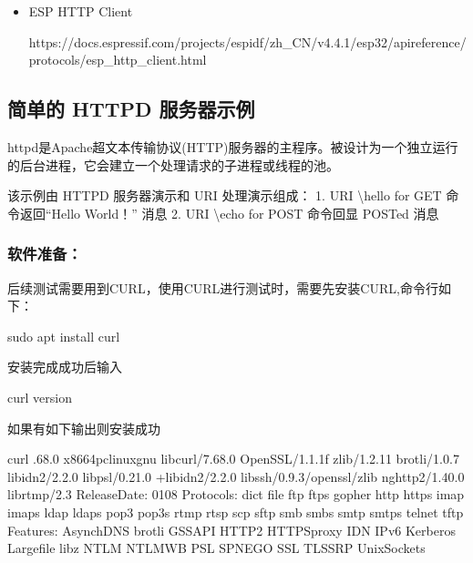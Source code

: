 \documentclass[a4paper,12pt,english]{sphinxmanual}
\begin{document}
{{\begin{itemize}
\sphinxAtStartPar
https://docs.espressif.com/projects/esp\sphinxhyphen{}idf/zh\_CN/v4.4.1/esp32/api\sphinxhyphen{}reference/protocols/esp\_http\_server.html

\item {} 
\sphinxAtStartPar
ESP HTTP Client

\sphinxAtStartPar
https://docs.espressif.com/projects/esp\sphinxhyphen{}idf/zh\_CN/v4.4.1/esp32/api\sphinxhyphen{}reference/protocols/esp\_http\_client.html

\end{itemize}


\subsection{简单的 HTTPD 服务器示例}
\label{\detokenize{exp-esp32/http:httpd}}
\sphinxAtStartPar
httpd是Apache超文本传输协议(HTTP)服务器的主程序。被设计为一个独立运行的后台进程，它会建立一个处理请求的子进程或线程的池。

\sphinxAtStartPar
该示例由 HTTPD 服务器演示和 URI 处理演示组成： 1. URI \textbackslash{}hello for GET 命令返回“Hello World！” 消息 2. URI \textbackslash{}echo for POST 命令回显 POSTed 消息


\subsubsection{软件准备：}
\label{\detokenize{exp-esp32/http:id2}}
\sphinxAtStartPar
后续测试需要用到CURL，使用CURL进行测试时，需要先安装CURL,命令行如下：

\begin{sphinxVerbatim}[commandchars=\\\{\}]
sudo apt install curl
\end{sphinxVerbatim}

\sphinxAtStartPar
安装完成成功后输入

\begin{sphinxVerbatim}[commandchars=\\\{\}]
curl \PYGZhy{}\PYGZhy{}version
\end{sphinxVerbatim}

\sphinxAtStartPar
如果有如下输出则安装成功

\begin{sphinxVerbatim}[commandchars=\\\{\}]
curl .68.0 x86\PYGZus{}64\PYGZhy{}pc\PYGZhy{}linux\PYGZhy{}gnu libcurl/7.68.0 OpenSSL/1.1.1f zlib/1.2.11 brotli/1.0.7 libidn2/2.2.0 libpsl/0.21.0 +libidn2/2.2.0 libssh/0.9.3/openssl/zlib nghttp2/1.40.0 librtmp/2.3
Release\PYGZhy{}Date: \PYGZhy{}01\PYGZhy{}08
Protocols: dict file ftp ftps gopher http https imap imaps ldap ldaps pop3 pop3s rtmp rtsp scp sftp smb smbs smtp smtps telnet tftp 
Features: AsynchDNS brotli GSS\PYGZhy{}API HTTP2 HTTPS\PYGZhy{}proxy IDN IPv6 Kerberos Largefile libz NTLM NTLM\PYGZus{}WB PSL SPNEGO SSL TLS\PYGZhy{}SRP UnixSockets
\end{sphinxVerbatim}


}}
\end{document}
